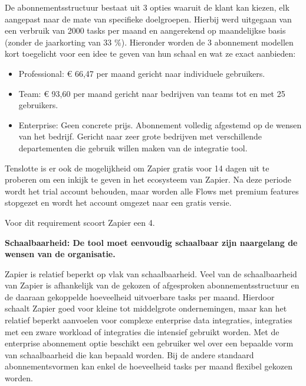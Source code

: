 \vspace{\baselineskip}

De abonnementsstructuur bestaat uit 3 opties waaruit de klant kan kiezen, elk aangepast naar de mate van specifieke doelgroepen. Hierbij werd uitgegaan van een verbruik van 2000 tasks per maand en aangerekend op maandelijkse basis (zonder de jaarkorting van 33 \%). Hieronder worden de 3 abonnement modellen kort toegelicht voor een idee te geven van hun schaal en wat ze exact aanbieden:

\begin{itemize}
    \item Professional: € 66,47 per maand gericht naar individuele gebruikers.
    \item Team: € 93,60 per maand gericht naar bedrijven van teams tot en met 25 gebruikers.
    \item Enterprise: Geen concrete prijs. Abonnement volledig afgestemd op de wensen van het bedrijf. Gericht naar zeer grote bedrijven met verschillende departementen die gebruik willen maken van de integratie tool.
\end{itemize}

Tenslotte is er ook de mogelijkheid om Zapier gratis voor 14 dagen uit te proberen om een inkijk te geven in het ecosysteem van Zapier. Na deze periode wordt het trial account behouden, maar worden alle Flows met premium features stopgezet en wordt het account omgezet naar een gratis versie.

Voor dit requirement scoort Zapier een 4.

\vspace{\baselineskip}

\textbf{Schaalbaarheid: De tool moet eenvoudig schaalbaar zijn naargelang de wensen van de organisatie.}

\vspace{\baselineskip}

Zapier is relatief beperkt op vlak van schaalbaarheid. Veel van de schaalbaarheid van Zapier is afhankelijk van de gekozen of afgesproken abonnementsstructuur en de daaraan gekoppelde hoeveelheid uitvoerbare tasks per maand. Hierdoor schaalt Zapier goed voor kleine tot middelgrote ondernemingen, maar kan het relatief beperkt aanvoelen voor complexe enterprise data integraties, integraties met een zware workload of integraties die intensief gebruikt worden. Met de enterprise abonnement optie beschikt een gebruiker wel over een bepaalde vorm van schaalbaarheid die kan bepaald worden. Bij de andere standaard abonnementsvormen kan enkel de hoeveelheid tasks per maand flexibel gekozen worden.



